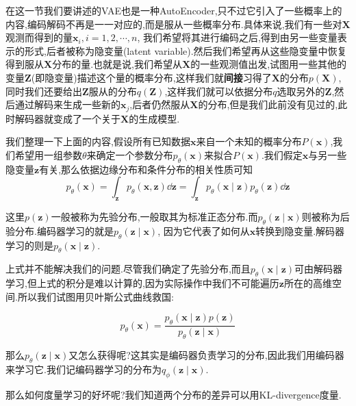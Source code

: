 	在这一节我们要讲述的VAE也是一种AutoEncoder,只不过它引入了一些概率上的内容,编码解码不再是一一对应的,而是服从一些概率分布.具体来说,我们有一些对$\bm X$观测而得到的量$\bm x_i, i = 1, 2, \cdots, n$, 我们希望将其进行编码之后,得到由另一些变量表示的形式,后者被称为隐变量(latent variable).然后我们希望再从这些隐变量中恢复得到服从$\bm X$分布的量.也就是说,我们希望从$\bm X$的一些观测值出发,试图用一些其他的变量$\bm Z$(即隐变量)描述这个量的概率分布,这样我们就\textbf{间接}习得了$\bm X$的分布$p(\bm X)$,同时我们还要给出$\bm Z$服从的分布$q(\bm Z)$,这样我们就可以依据分布$q$选取另外的$\bm Z$,然后通过解码来生成一些新的$\bm x_j$,后者仍然服从$\bm X$的分布,但是我们此前没有见过的,此时解码器就变成了一个关于$\bm X$的生成模型.
	
	我们整理一下上面的内容,假设所有已知数据$\bm x$来自一个未知的概率分布$P(\bm x)$,我们希望用一组参数$\theta$来确定一个参数分布$p_{\theta}(\bm x)$来拟合$P(\bm x)$.我们假定$\bm x$与另一些隐变量$\bm z$有关,那么依据边缘分布和条件分布的相关性质可知
	\begin{equation}
		p_{\theta}(\bm x) = \int_{\bm z} p_\theta(\bm x, \bm z) \dd \bm z = \int_{\bm z} p_\theta(\bm x\mid \bm z) p_{\theta}(\bm z) \dd \bm z
	\end{equation}

	这里$p(\bm z)$一般被称为先验分布,一般取其为标准正态分布.而$p_{\theta}(\bm z \mid \bm x)$则被称为后验分布.编码器学习的就是$p_{\theta}(\bm z \mid \bm x)$, 因为它代表了如何从$\bm x$转换到隐变量.解码器学习的则是$p_{\theta}(\bm x \mid \bm z)$.
	
	上式并不能解决我们的问题.尽管我们确定了先验分布,而且$p_{\theta}(\bm x \mid \bm z)$可由解码器学习,但上式的积分是难以计算的,因为实际操作中我们不可能遍历$\bm z$所在的高维空间.所以我们试图用贝叶斯公式曲线救国:
	
	\begin{equation}
		p_{\theta}(\bm x) = \frac{p_\theta(\bm x\mid \bm z) p(\bm z)}{p_\theta(\bm z\mid \bm x)}
	\end{equation}

	那么$p_\theta(\bm z\mid \bm x)$又怎么获得呢?这其实是编码器负责学习的分布,因此我们用编码器来学习它.我们记编码器学习的分布为$q_\phi(\bm z\mid \bm x)$.
	
	那么如何度量学习的好坏呢?我们知道两个分布的差异可以用KL-divergence度量.
	
